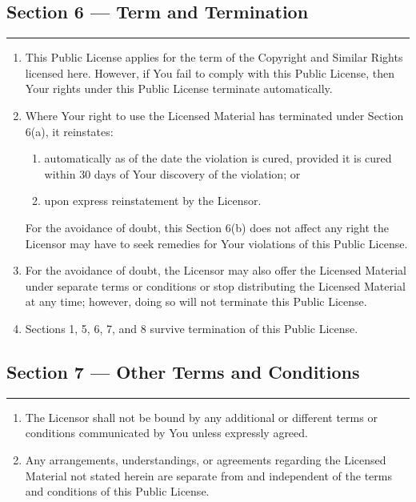 \subsection*{Section 6 --- Term and Termination}
\noindent\rule{\textwidth}{0.3pt}
\smallskip

\begin{enumerate}[label=(\alph*), leftmargin=1.8em, labelwidth=1.5em, align=left, itemsep=0.5em]
	\item This Public License applies for the term of the Copyright and Similar Rights licensed here. However, if You fail to comply with this Public License, then Your rights under this Public License terminate automatically.
	\item Where Your right to use the Licensed Material has terminated under Section 6(a), it reinstates:
	      \begin{enumerate}[label=\arabic*., leftmargin=1.8em, labelwidth=1.2em, align=left, itemsep=0.2em]
		      \item automatically as of the date the violation is cured, provided it is cured within 30 days of Your discovery of the violation; or
		      \item upon express reinstatement by the Licensor.
	      \end{enumerate}

	      For the avoidance of doubt, this Section 6(b) does not affect any right the Licensor may have to seek remedies for Your violations of this Public License.

	\item For the avoidance of doubt, the Licensor may also offer the Licensed Material under separate terms or conditions or stop distributing the Licensed Material at any time; however, doing so will not terminate this Public License.
	\item Sections 1, 5, 6, 7, and 8 survive termination of this Public License.
\end{enumerate}

\subsection*{Section 7 --- Other Terms and Conditions}
\noindent\rule{\textwidth}{0.3pt}
\smallskip

\begin{enumerate}[label=(\alph*), leftmargin=1.8em, labelwidth=1.5em, align=left, itemsep=0.4em]
	\item The Licensor shall not be bound by any additional or different terms or conditions communicated by You unless expressly agreed.
	\item Any arrangements, understandings, or agreements regarding the Licensed Material not stated herein are separate from and independent of the terms and conditions of this Public License.
\end{enumerate}

